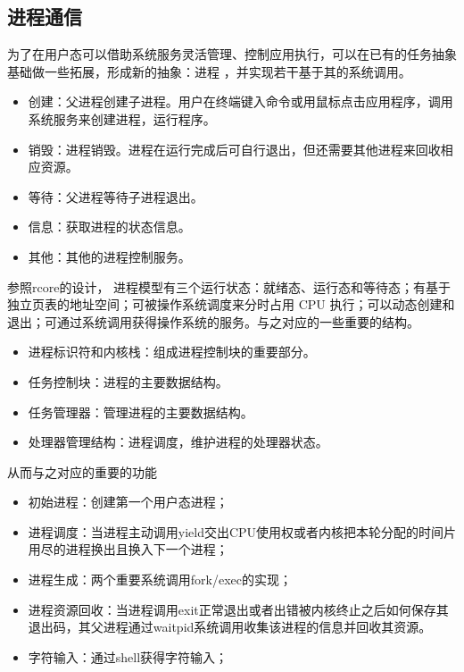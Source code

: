 \subsection{进程通信}
为了在用户态可以借助系统服务灵活管理、控制应用执行，可以在已有的任务抽象基础做一些拓展，形成新的抽象：进程 ，并实现若干基于其的系统调用。

\begin{itemize}
\item 创建：父进程创建子进程。用户在终端键入命令或用鼠标点击应用程序，调用系统服务来创建进程，运行程序。
\item 销毁：进程销毁。进程在运行完成后可自行退出，但还需要其他进程来回收相应资源。
\item 等待：父进程等待子进程退出。
\item 信息：获取进程的状态信息。
\item 其他：其他的进程控制服务。
\end{itemize}

参照rcore的设计， 进程模型有三个运行状态：就绪态、运行态和等待态；有基于独立页表的地址空间；可被操作系统调度来分时占用 CPU 执行；可以动态创建和退出；可通过系统调用获得操作系统的服务。与之对应的一些重要的结构。

\begin{itemize}
\item 进程标识符和内核栈：组成进程控制块的重要部分。
\item 任务控制块：进程的主要数据结构。
\item 任务管理器：管理进程的主要数据结构。
\item 处理器管理结构：进程调度，维护进程的处理器状态。
\end{itemize}

从而与之对应的重要的功能

\begin{itemize}
\item 初始进程：创建第一个用户态进程；
\item 进程调度：当进程主动调用yield交出CPU使用权或者内核把本轮分配的时间片用尽的进程换出且换入下一个进程；
\item 进程生成：两个重要系统调用fork/exec的实现；
\item 进程资源回收：当进程调用exit正常退出或者出错被内核终止之后如何保存其退出码，其父进程通过waitpid系统调用收集该进程的信息并回收其资源。
\item 字符输入：通过shell获得字符输入；
\end{itemize}

